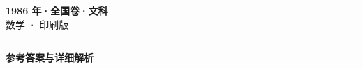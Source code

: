 \documentclass[zihao=5, a4paper]{ctexart}
\begin{document}
\begin{center}
  {\Large\bfseries 1986 年·全国卷·文科}\\[4pt]
  {\large 数学 · 印刷版}
\end{center}
\medskip
{}

\par\bigskip\hrule\bigskip
{}
\begin{center}{\large\bfseries 参考答案与详细解析}\end{center}
\smallskip

\end{document}
